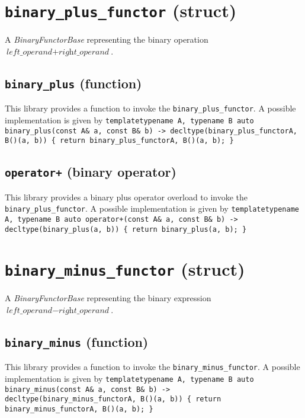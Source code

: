 \documentclass[oneside]{book}
\begin{document}


\section{\texttt{binary\_plus\_functor} (struct)}
A \textit{BinaryFunctorBase} representing the binary operation $\textit{left\_operand} + \textit{right\_operand}$.\newline

\subsection{\texttt{binary\_plus} (function)}
This library provides a function to invoke the \texttt{binary\_plus\_functor}.
A possible implementation is given by\newline
\texttt{template\textlangle typename A, typename B\textrangle\newline
auto binary\_plus(const A\& a, const B\& b) -> decltype(binary\_plus\_functor\textlangle A, B\textrangle()(a, b))\newline
\{ return binary\_plus\_functor\textlangle A, B\textrangle()(a, b); \}}

\subsection{\texttt{operator+} (binary operator)}
This library provides a binary plus operator overload to invoke the \texttt{binary\_plus\_functor}.
A possible implementation is given by\newline
\texttt{template\textlangle typename A, typename B\textrangle\newline
auto operator+(const A\& a, const B\& b) -> decltype(binary\_plus(a, b))\newline
\{ return binary\_plus(a, b); \}}

\section{\texttt{binary\_minus\_functor} (struct)}
A \textit{BinaryFunctorBase} representing the binary expression $\textit{left\_operand} - \textit{right\_operand}$.\newline

\subsection{\texttt{binary\_minus} (function)}
This library provides a function to invoke the \texttt{binary\_minus\_functor}.
A possible implementation is given by\newline
\texttt{template\textlangle typename A, typename B\textrangle\newline
auto binary\_minus(const A\& a, const B\& b) -> decltype(binary\_minus\_functor\textlangle A, B\textrangle()(a, b))\newline
\{ return binary\_minus\_functor\textlangle A, B\textrangle()(a, b); \}}
\end{document}
